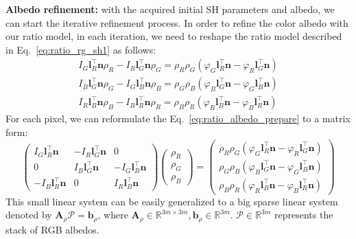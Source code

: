 \textbf{Albedo refinement:}
with the acquired initial SH parameters and albedo, we can start the iterative refinement process.
In order to refine the color albedo with our ratio model, in each iteration, we need to reshape the ratio model described in Eq.~\ref{eq:ratio_rg_sh1} as follows:
\begin{equation}\label{eq:ratio_albedo_prepare}
\begin{split}
I_G \mathbf{l}_R^\top\mathbf{n} \rho_R - I_R \mathbf{l}_G^\top\mathbf{n} \rho_G  = \rho_R \rho_G (\varphi_G\mathbf{l}_R^\top \mathbf{n} - \varphi_R\mathbf{l}_G^\top \mathbf{n})\\
I_B \mathbf{l}_G^\top\mathbf{n} \rho_G - I_G \mathbf{l}_B^\top\mathbf{n} \rho_B  = \rho_G \rho_B (\varphi_B\mathbf{l}_G^\top \mathbf{n} - \varphi_G\mathbf{l}_B^\top \mathbf{n})\\
I_R \mathbf{l}_B^\top\mathbf{n} \rho_B - I_B \mathbf{l}_R^\top\mathbf{n} \rho_R  = \rho_B \rho_R (\varphi_R\mathbf{l}_B^\top \mathbf{n} - \varphi_B\mathbf{l}_R^\top \mathbf{n})
\end{split}
\end{equation}
For each pixel, we can reformulate the Eq.~\ref{eq:ratio_albedo_prepare} to a matrix form:
\begin{equation}\label{eq:rho_matrix}
    \begin{pmatrix}
        I_G \mathbf{l}_R^\top\mathbf{n} & - I_R \mathbf{l}_G^\top\mathbf{n} & 0 \\
        0 & I_B \mathbf{l}_G^\top\mathbf{n} & - I_G \mathbf{l}_B^\top\mathbf{n} \\
        - I_B \mathbf{l}_R^\top\mathbf{n} & 0 & I_R \mathbf{l}_B^\top\mathbf{n} 
    \end{pmatrix}
    \begin{pmatrix}
        \rho_R\\
        \rho_G\\
        \rho_B
     \end{pmatrix}
    =
    \begin{pmatrix}
        \rho_R \rho_G (\varphi_G\mathbf{l}_R^\top \mathbf{n} - \varphi_R\mathbf{l}_G^\top \mathbf{n})\\
        \rho_G \rho_B (\varphi_B\mathbf{l}_G^\top \mathbf{n} - \varphi_G\mathbf{l}_B^\top \mathbf{n})\\
        \rho_B \rho_R (\varphi_R\mathbf{l}_B^\top \mathbf{n} - \varphi_B\mathbf{l}_R^\top \mathbf{n})
    \end{pmatrix}
\end{equation}
This small linear system can be easily generalized to a big sparse linear system denoted by $\mathbf{A}_{\rho} {\mathcal{P}} = \mathbf{b}_{\rho}$, where $\mathbf{A}_{\rho}\in\mathbb{R}^{3m\times3m}, \mathbf{b}_{\rho}\in\mathbb{R}^{3m}$. $\mathcal{P} \in\mathbb{R}^{3m} $ represents the stack of RGB albedos.

